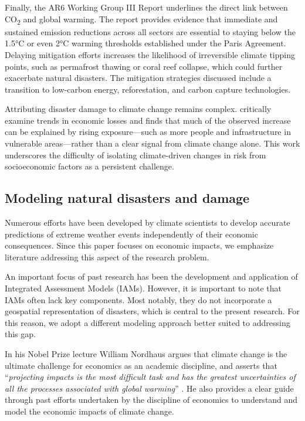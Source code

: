 Finally, the AR6 Working Group III Report \citep{IPCC_AR6_WGII_2022} underlines the direct link between CO\textsubscript{2} and global warming. The report provides evidence that immediate and sustained emission reductions across all sectors are essential to staying below the 1.5°C or even 2°C warming thresholds established under the Paris Agreement. Delaying mitigation efforts increases the likelihood of irreversible climate tipping points, such as permafrost thawing or coral reef collapse, which could further exacerbate natural disasters. The mitigation strategies discussed include a transition to low-carbon energy, reforestation, and carbon capture technologies.

Attributing disaster damage to climate change remains complex. \citet{bouwer2011have} critically examine trends in economic losses and finds that much of the observed increase can be explained by rising exposure---such as more people and infrastructure in vulnerable areas---rather than a clear signal from climate change alone. This work underscores the difficulty of isolating climate-driven changes in risk from socioeconomic factors as a persistent challenge.

\subsection{Modeling natural disasters and damage}

Numerous efforts have been developed by climate scientists to develop accurate predictions of extreme weather events independently of their economic consequences. Since this paper focuses on economic impacts, we emphasize literature addressing this aspect of the research problem.

An important focus of past research has been the development and application of Integrated Assessment Models (IAMs). However, it is important to note that IAMs often lack key components. Most notably, they do not incorporate a geospatial representation of disasters, which is central to the present research. For this reason, we adopt a different modeling approach better suited to addressing this gap.

In his Nobel Prize lecture William Nordhaus argues that climate change is the ultimate challenge for economics as an academic discipline, and asserts that ``\textit{projecting impacts is the most difficult task and has the greatest uncertainties of all the processes associated with global warming}'' \citep{nordhaus2019climate}. He also provides a clear guide through past efforts undertaken by the discipline of economics to understand and model the economic impacts of climate change.

